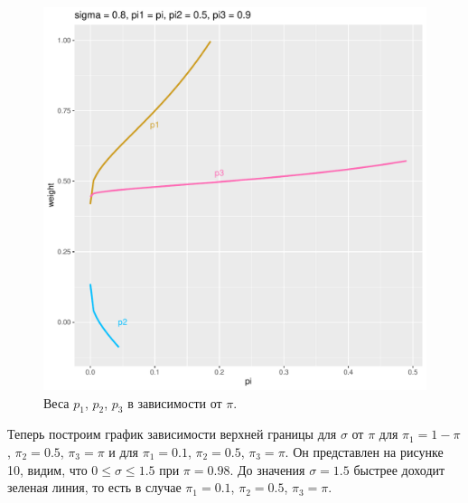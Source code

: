 \documentclass[12pt]{article}
\begin{document}
\begin{figure}[!hhh]
	\begin{center}
		\begin{minipage}[h]{0.95\linewidth}
			\includegraphics[width=1\linewidth]{img/p123_3.pdf}
			\caption{Веса $p_{1}$, $p_{2}$, $p_{3}$ в зависимости от $\pi$. } %
			\label{ris11} %
		\end{minipage}
	\end{center}
\end{figure}

Теперь построим график зависимости верхней границы для $\sigma$ от $\pi$ для $\pi_{1} = 1-\pi$, $\pi_{2} = 0.5$, $\pi_{3} = \pi$ и для $\pi_{1} = 0.1$, $\pi_{2} = 0.5$, $\pi_{3} = \pi$. Он представлен на рисунке 10, видим, что $0 \leq \sigma \leq 1.5$ при $\pi = 0.98$. До значения $\sigma = 1.5$ быстрее доходит зеленая линия, то есть в случае $\pi_{1} = 0.1$, $\pi_{2} = 0.5$, $\pi_{3} = \pi$.
\end{document}
